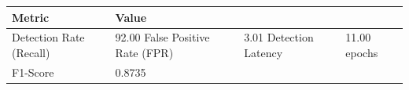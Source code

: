 \begin{tabular}{ll}
\toprule
Metric & Value \\
\midrule
Detection Rate (Recall) & 92.00%
False Positive Rate (FPR) & 3.01%
Detection Latency & 11.00 epochs \\
F1-Score & 0.8735 \\
\bottomrule
\end{tabular}
